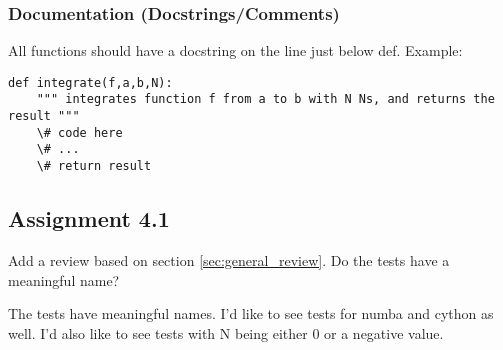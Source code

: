\documentclass[a4paper]{article}
\begin{document}
\subsubsection*{Documentation (Docstrings/Comments)}
All functions should have a docstring on the line just below def.
Example:
\begin{verbatim}
def integrate(f,a,b,N):
    """ integrates function f from a to b with N Ns, and returns the result """
    \# code here
    \# ...
    \# return result
\end{verbatim}

\subsection*{Assignment 4.1}
Add a review based on section \ref{sec:general_review}. Do the tests have a meaningful name?
			
            The tests have meaningful names.
            I'd like to see tests for numba and cython as well.
            I'd also like to see tests with N being either 0 or a negative value.
            
\end{document}
